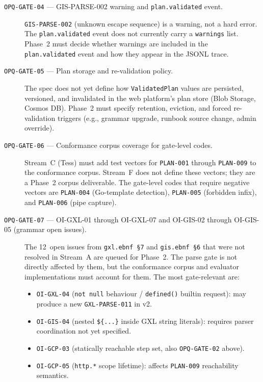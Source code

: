 \begin{description}
  \item[\texttt{OPQ-GATE-04} — GIS-PARSE-002 warning and
    \texttt{plan.validated} event.]
    \texttt{GIS-PARSE-002} (unknown escape sequence) is a warning, not a hard
    error.  The \texttt{plan.validated} event does not currently carry a
    \texttt{warnings} list.  Phase~2 must decide whether warnings are
    included in the \texttt{plan.validated} event and how they appear in the
    JSONL trace.

  \item[\texttt{OPQ-GATE-05} — Plan storage and re-validation policy.]
    The spec does not yet define how \texttt{ValidatedPlan} values are
    persisted, versioned, and invalidated in the web platform's plan store
    (Blob Storage, Cosmos DB).  Phase~2 must specify retention, eviction,
    and forced re-validation triggers (e.g., grammar upgrade, runbook source
    change, admin override).

  \item[\texttt{OPQ-GATE-06} — Conformance corpus coverage for gate-level
    codes.]
    Stream~C (Tess) must add test vectors for \texttt{PLAN-001} through
    \texttt{PLAN-009} to the conformance corpus.  Stream~F does not define
    these vectors; they are a Phase~2 corpus deliverable.  The gate-level
    codes that require negative vectors are \texttt{PLAN-004}
    (Go-template detection), \texttt{PLAN-005} (forbidden infix), and
    \texttt{PLAN-006} (pipe capture).

  \item[\texttt{OPQ-GATE-07} — OI-GXL-01 through OI-GXL-07 and
    OI-GIS-02 through OI-GIS-05 (grammar open issues).]
    The 12~open issues from \texttt{gxl.ebnf~\S7} and
    \texttt{gis.ebnf~\S6} that were not resolved in Stream~A are queued for
    Phase~2.  The parse gate is not directly affected by them, but the
    conformance corpus and evaluator implementations must account for them.
    The most gate-relevant are:
    \begin{itemize}
      \item \texttt{OI-GXL-04} (\texttt{not null} behaviour / \texttt{defined()}
        builtin request): may produce a new \texttt{GXL-PARSE-011} in v2.
      \item \texttt{OI-GIS-04} (nested \texttt{\$\{...\}} inside GXL string
        literals): requires parser coordination not yet specified.
      \item \texttt{OI-GCP-03} (statically reachable step set, also
        \texttt{OPQ-GATE-02} above).
      \item \texttt{OI-GCP-05} (\texttt{http.*} scope lifetime): affects
        \texttt{PLAN-009} reachability semantics.
    \end{itemize}
\end{description}
